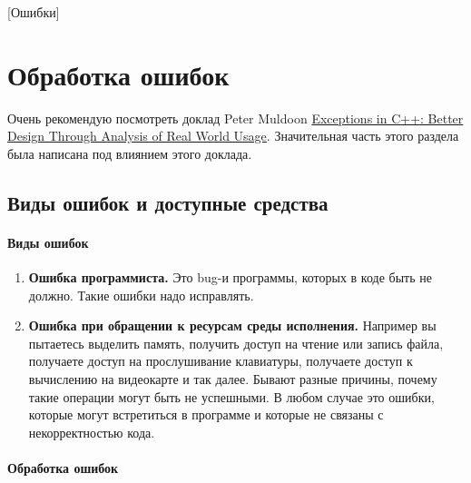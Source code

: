 [Ошибки]


\section{Обработка ошибок}

Очень рекомендую посмотреть доклад Peter Muldoon \href{https://youtu.be/HXJmrMnnDYQ?si=uylqtbTLdzKMrg9S}{Exceptions in C++: Better Design Through Analysis of Real World Usage}.
Значительная часть этого раздела была написана под влиянием этого доклада.

\subsection{Виды ошибок и доступные средства}

\paragraph{Виды ошибок}

\begin{enumerate}
\item \textbf{Ошибка программиста.}
Это bug-и программы, которых в коде быть не должно.
Такие ошибки надо исправлять.

\item \textbf{Ошибка при обращении к ресурсам среды исполнения.}
Например вы пытаетесь выделить память, получить доступ на чтение или запись файла, получаете доступ на прослушивание клавиатуры, получаете доступ к вычислению на видеокарте и так далее.
Бывают разные причины, почему такие операции могут быть не успешными.
В любом случае это ошибки, которые могут встретиться в  программе и которые не связаны с некорректностью кода.
\end{enumerate}

\paragraph{Обработка ошибок}


